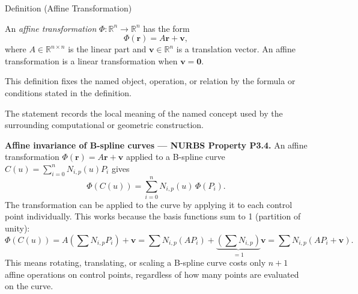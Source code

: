\begin{definitionbox}{Definition (Affine Transformation)}
\begin{definition}
\label{def:affine-transformation}
An \emph{affine transformation} $\Phi : \mathbb{R}^n \to \mathbb{R}^n$ has the form
\[
  \Phi(\mathbf{r}) = A\mathbf{r} + \mathbf{v},
\]
where $A \in \mathbb{R}^{n \times n}$ is the linear part and $\mathbf{v} \in \mathbb{R}^n$
is a translation vector.
An affine transformation is a linear transformation when $\mathbf{v} = \mathbf{0}$.
\end{definition}
\end{definitionbox}
\begin{remark*}
This definition fixes the named object, operation, or relation by the formula
or conditions stated in the definition.
\end{remark*}

\begin{remark*}[Interpretation]
The statement records the local meaning of the named concept used by the
surrounding computational or geometric construction.
\end{remark*}

\DefinitionalRoot

\begin{remark*}[Exposition]
\textbf{Affine invariance of B-spline curves --- NURBS Property P3.4.}
An affine transformation $\Phi(\mathbf{r}) = A\mathbf{r} + \mathbf{v}$ applied to
a B-spline curve $C(u) = \sum_{i=0}^n N_{i,p}(u) P_i$ gives
\[
  \Phi(C(u)) = \sum_{i=0}^n N_{i,p}(u)\,\Phi(P_i).
\]
The transformation can be applied to the curve by applying it to each
control point individually.
This works because the basis functions sum to 1 (partition of unity):
\[
  \Phi(C(u)) = A\!\left(\sum N_{i,p} P_i\right) + \mathbf{v}
             = \sum N_{i,p} (AP_i) + \underbrace{\left(\sum N_{i,p}\right)}_{=1}\mathbf{v}
             = \sum N_{i,p}(AP_i + \mathbf{v}).
\]
This means rotating, translating, or scaling a B-spline curve costs only
$n+1$ affine operations on control points, regardless of how many points
are evaluated on the curve.
\end{remark*}
